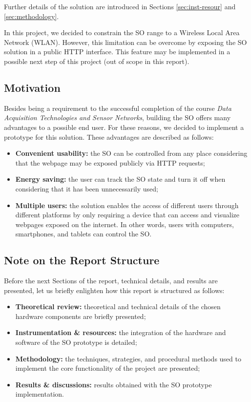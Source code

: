 Further details of the solution are introduced in Sections
\ref{sec:inst-resour} and \ref{sec:methodology}.

In this project, we decided to constrain the SO range to a Wireless Local Area
Network (WLAN). However, this limitation can be overcome by exposing the SO
solution in a public HTTP interface. This feature may be implemented in a
possible next step of this project (out of scope in this report).

\subsection{Motivation}

Besides being a requirement to the successful completion of the course
\textit{Data Acquisition Technologies and Sensor Networks}, building the SO
offers many advantages to a possible end user. For these reasons, we
decided to implement a prototype for this solution. These advantages are
described as follows:

\begin{itemize}
    \item \textbf{Convenient usability:} the SO can be controlled from any place
    considering that the webpage may be exposed publicly via HTTP requests;
    \item \textbf{Energy saving:} the user can track the SO state and turn it
    off when considering that it has been unnecessarily used;
    \item \textbf{Multiple users:} the solution enables the access of different
    users through different platforms by only requiring a device that can access
    and visualize webpages exposed on the internet. In other words, users with
    computers, smartphones, and tablets can control the SO.
\end{itemize}

\subsection{Note on the Report Structure}

Before the next Sections of the report, technical details, and results are
presented, let us briefly enlighten how this report is structured as follows:

\begin{itemize}
    \item \textbf{Theoretical review:} theoretical and technical details of the
    chosen hardware components are briefly presented;
    \item \textbf{Instrumentation \& resources:} the integration of the hardware
    and software of the SO prototype is detailed;
    \item \textbf{Methodology:} the techniques, strategies, and procedural
    methods used to implement the core functionality of the project are
    presented;
    \item \textbf{Results \& discussions:} results obtained with the SO
    prototype implementation.
\end{itemize}


